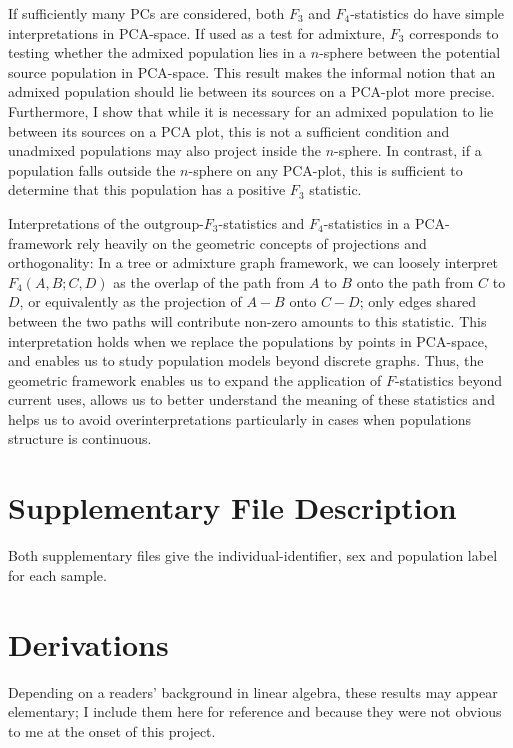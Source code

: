 \documentclass[12pt,fullpage, a4paper]{article}
\begin{document}
If sufficiently many PCs are considered, both $F_3$ and $F_4$-statistics do have simple interpretations in PCA-space. If used as a test for admixture, $F_3$ corresponds to testing whether the admixed population lies in a $n$-sphere between the potential source population in PCA-space. This result makes the informal notion that an admixed population should lie between its sources on a PCA-plot more precise. Furthermore, I show that while it is necessary for an admixed population to lie between its sources on a PCA plot, this is not a sufficient condition and unadmixed populations may also project inside the $n$-sphere. In contrast, if a population falls outside the $n$-sphere on any PCA-plot, this is sufficient to determine that this population has a positive $F_3$ statistic. 

Interpretations of the outgroup-$F_3$-statistics and $F_4$-statistics in a PCA-framework rely heavily on the geometric concepts of projections and orthogonality: In a tree or admixture graph framework, we can loosely interpret $F_4(A, B; C, D)$ as the overlap of the path from $A$ to $B$ onto the path from $C$ to $D$, or equivalently as the  projection of $A-B$ onto $C-D$; only edges shared between the two paths will contribute non-zero amounts to this statistic. This interpretation holds when we replace the populations by points in PCA-space, and enables us to study population models beyond discrete graphs. Thus, the geometric framework enables us to expand the application of $F$-statistics beyond current uses, allows us to better understand the meaning of these statistics and helps us to avoid overinterpretations particularly in cases when populations structure is continuous.



\section{Supplementary File Description}
Both supplementary files give the individual-identifier, sex and population label for each sample.

%
\printbibliography

\newpage
\appendix
\section{Derivations}\label{appendix:fonpc}
\setcounter{equation}{0}
\renewcommand{\theequation}{\thesection\arabic{equation}}
Depending on a readers' background in linear algebra, these results may appear elementary; I include them here for reference and because they were not obvious to me at the onset of this project.
\end{document}
